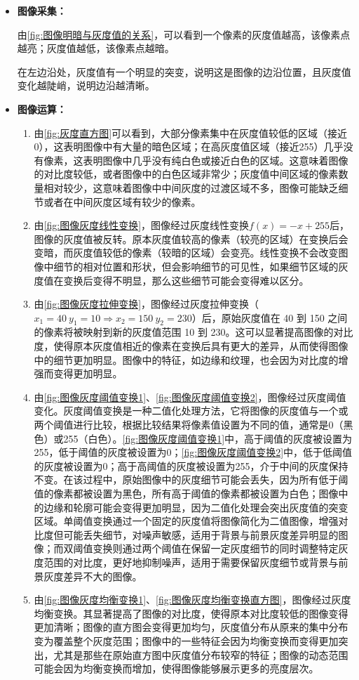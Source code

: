 \documentclass[dvipsnames, svgnames,a4paper,11pt]{article}
\begin{document}
		\begin{itemize}
			\item \textbf{图像采集：}

				由\cref{fig:图像明暗与灰度值的关系}，可以看到一个像素的灰度值越高，该像素点越亮；灰度值越低，该像素点越暗。

				在左边沿处，灰度值有一个明显的突变，说明这是图像的边沿位置，且灰度值变化越陡峭，说明边沿越清晰。

			\item \textbf{图像运算：}
			
				\begin{enumerate}
					\item 由\cref{fig:灰度直方图}可以看到，大部分像素集中在灰度值较低的区域（接近0），这表明图像中有大量的暗色区域；在高灰度值区域（接近255）几乎没有像素，这表明图像中几乎没有纯白色或接近白色的区域。这意味着图像的对比度较低，或者图像中的白色区域非常少；灰度值中间区域的像素数量相对较少，这意味着图像中中间灰度的过渡区域不多，图像可能缺乏细节或者在中间灰度区域有较少的像素。
					\item 由\cref{fig:图像灰度线性变换}，图像经过灰度线性变换$f(x) = -x + 255$后，图像的灰度值被反转。原本灰度值较高的像素（较亮的区域）在变换后会变暗，而灰度值较低的像素（较暗的区域）会变亮。线性变换不会改变图像中细节的相对位置和形状，但会影响细节的可见性，如果细节区域的灰度值在变换后变得不明显，那么这些细节可能会变得难以区分。
					\item 由\cref{fig:图像灰度拉伸变换}，图像经过灰度拉伸变换（$x_1 = 40 \ y_1 = 10 \Rightarrow x_2 = 150 \ y_2 = 230$）后，原始灰度值在 40 到 150 之间的像素将被映射到新的灰度值范围 10 到 230。这可以显著提高图像的对比度，使得原本灰度值相近的像素在变换后具有更大的差异，从而使得图像中的细节更加明显。图像中的特征，如边缘和纹理，也会因为对比度的增强而变得更加明显。
					\item 由\cref{fig:图像灰度阈值变换1}、\cref{fig:图像灰度阈值变换2}，图像经过灰度阈值变化。灰度阈值变换是一种二值化处理方法，它将图像的灰度值与一个或两个阈值进行比较，根据比较结果将像素值设置为不同的值，通常是0（黑色）或255（白色）。\cref{fig:图像灰度阈值变换1}中，高于阈值的灰度被设置为255，低于阈值的灰度被设置为0；\cref{fig:图像灰度阈值变换2}中，低于低阈值的灰度被设置为0；高于高阈值的灰度被设置为255，介于中间的灰度保持不变。在该过程中，原始图像中的灰度细节可能会丢失，因为所有低于阈值的像素都被设置为黑色，所有高于阈值的像素都被设置为白色；图像中的边缘和轮廓可能会变得更加明显，因为二值化处理会突出灰度值的突变区域。单阈值变换通过一个固定的灰度值将图像简化为二值图像，增强对比度但可能丢失细节，对噪声敏感，适用于背景与前景灰度差异明显的图像；而双阈值变换则通过两个阈值在保留一定灰度细节的同时调整特定灰度范围的对比度，更好地抑制噪声，适用于需要保留灰度细节或背景与前景灰度差异不大的图像。
					\item 由\cref{fig:图像灰度均衡变换1}、\cref{fig:图像灰度均衡变换直方图}，图像经过灰度均衡变换。其显著提高了图像的对比度，使得原本对比度较低的图像变得更加清晰；图像的直方图会变得更加均匀，灰度值分布从原来的集中分布变为覆盖整个灰度范围；图像中的一些特征会因为均衡变换而变得更加突出，尤其是那些在原始直方图中灰度值分布较窄的特征；图像的动态范围可能会因为均衡变换而增加，使得图像能够展示更多的亮度层次。
				\end{enumerate}



\end{itemize}
\end{document}
